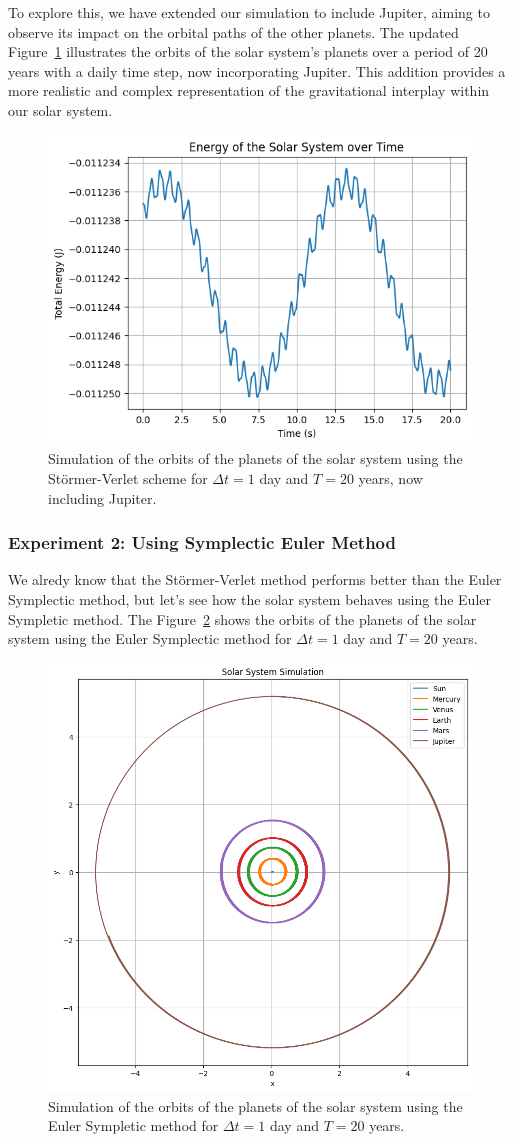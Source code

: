 \documentclass{report}
\begin{document}
To explore this, we have extended our simulation to include Jupiter, aiming to observe its impact on the orbital paths of the other planets. The updated Figure~\ref{fig:solarsystemjupiter} illustrates the orbits of the solar system's planets over a period of 20 years with a daily time step, now incorporating Jupiter. This addition provides a more realistic and complex representation of the gravitational interplay within our solar system.

\begin{figure}[H]
	\centering
	\includegraphics[width=0.5\linewidth]{./Figures/SolarSystem/orbitsjupiter.png}
	\caption{Simulation of the orbits of the planets of the solar system using the Störmer-Verlet scheme for \(\Delta t = 1\) day and \(T = 20\) years, now including Jupiter.}
	\label{fig:solarsystemjupiter}
\end{figure}


\subsubsection{Experiment 2: Using Symplectic Euler Method}
\label{sec:using_symplectic_euler_method}

We alredy know that the Störmer-Verlet method performs better than the Euler Symplectic method, but let's see how the solar system behaves using the Euler Sympletic method. The Figure~\ref{fig:solarsystemeuler} shows the orbits of the planets of the solar system using the Euler Symplectic method for \(\Delta t = 1\) day and \(T = 20\) years.

\begin{figure}[H]
	\centering
	\includegraphics[width=0.5\linewidth]{./Figures/SolarSystem/orbits_euler.png}
	\caption{Simulation of the orbits of the planets of the solar system using the Euler Sympletic method for \(\Delta t = 1\) day and \(T = 20\) years.}
	\label{fig:solarsystemeuler}
\end{figure}
\end{document}
